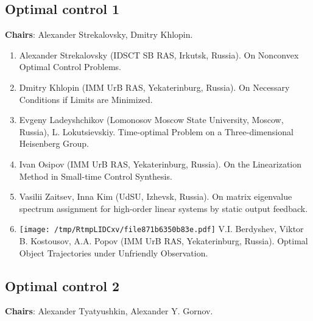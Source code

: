 \documentclass[
]{article}
\providecommand{\tightlist}{%
  \setlength{\itemsep}{0pt}\setlength{\parskip}{0pt}}
\begin{document}
\hypertarget{oc1}{%
\subsection{Optimal control 1}\label{oc1}}

\textbf{Chairs}: Alexander Strekalovsky, Dmitry Khlopin.

\begin{enumerate}
\def\labelenumi{\arabic{enumi}.}
\tightlist
\item
  Alexander Strekalovsky (IDSCT SB RAS, Irkutsk, Russia). On Nonconvex
  Optimal Control Problems.
\item
  Dmitry Khlopin (IMM UrB RAS, Yekaterinburg, Russia). On Necessary
  Conditions if Limits are Minimized.
\item
  Evgeny Ladeyshchikov (Lomonosov Moscow State University, Moscow,
  Russia), L. Lokutsievskiy. Time-optimal Problem on a Three-dimensional
  Heisenberg Group.
\item
  Ivan Osipov (IMM UrB RAS, Yekaterinburg, Russia). On the Linearization
  Method in Small-time Control Synthesis.
\item
  Vasilii Zaitsev, Inna Kim (UdSU, Izhevsk, Russia). On matrix
  eigenvalue spectrum assignment for high-order linear systems by static
  output feedback.
\item
  \protect\texttt{[image: /tmp/RtmpLIDCxv/file871b6350b83e.pdf]}
  V.I. Berdyshev, Viktor B. Kostousov, A.A. Popov (IMM UrB RAS,
  Yekaterinburg, Russia). Optimal Object Trajectories under Unfriendly
  Observation.
\end{enumerate}

\hypertarget{oc2}{%
\subsection{Optimal control 2}\label{oc2}}

\textbf{Chairs}: Alexander Tyatyushkin, Alexander Y. Gornov.
\end{document}
